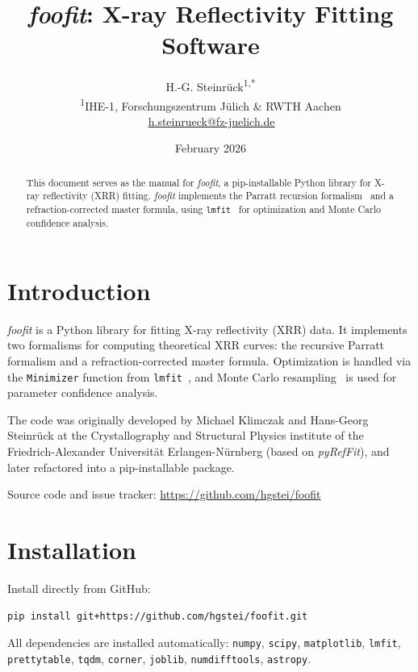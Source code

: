 \documentclass[11pt,a4paper]{article}
\title{\textit{foofit}: X-ray Reflectivity Fitting Software}
\author{
  H.-G. Steinr\"uck\textsuperscript{1,*} \\[4pt]
  \small \textsuperscript{1}IHE-1, Forschungszentrum J\"ulich \& RWTH Aachen \\
  \small *\,\href{mailto:h.steinrueck@fz-juelich.de}{h.steinrueck@fz-juelich.de}
}
\date{February 2026}
\begin{document}
\maketitle

\begin{abstract}
This document serves as the manual for \textit{foofit}, a pip-installable Python library
for X-ray reflectivity (XRR) fitting. \textit{foofit} implements the Parratt recursion
formalism~\cite{Parratt1954} and a refraction-corrected master formula, using
\texttt{lmfit}~\cite{Newville2014} for optimization and Monte Carlo confidence analysis.
\end{abstract}

\section{Introduction}

\textit{foofit} is a Python library for fitting X-ray reflectivity (XRR) data. It implements
two formalisms for computing theoretical XRR curves: the recursive Parratt formalism and a
refraction-corrected master formula. Optimization is handled via the \texttt{Minimizer}
function from \texttt{lmfit}~\cite{Newville2014}, and Monte Carlo resampling~\cite{Heinrich2009}
is used for parameter confidence analysis.

The code was originally developed by Michael Klimczak and Hans-Georg Steinr\"uck at the
Crystallography and Structural Physics institute of the Friedrich-Alexander Universit\"at
Erlangen-N\"urnberg (based on \textit{pyRefFit}), and later refactored into a
pip-installable package.

Source code and issue tracker: \url{https://github.com/hgstei/foofit}

\section{Installation}

Install directly from GitHub:
\begin{verbatim}
pip install git+https://github.com/hgstei/foofit.git
\end{verbatim}

All dependencies are installed automatically:
\texttt{numpy}, \texttt{scipy}, \texttt{matplotlib}, \texttt{lmfit}, \texttt{prettytable},
\texttt{tqdm}, \texttt{corner}, \texttt{joblib}, \texttt{numdifftools}, \texttt{astropy}.
\end{document}
